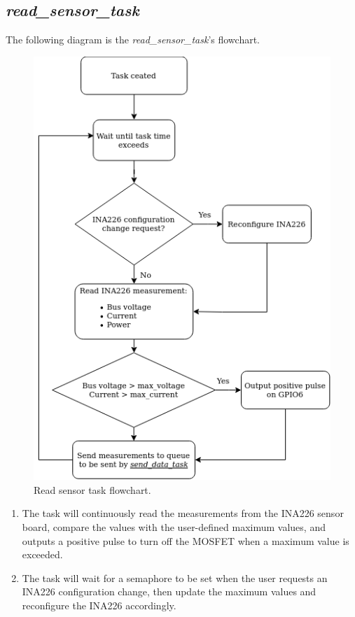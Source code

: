 \documentclass[../main.tex]{subfiles}
\begin{document}
    \pagebreak
    \subsection{\textit{read\_sensor\_task}}
    The following diagram is the \textit{read\_sensor\_task}'s flowchart.

    \begin{figure}[!h]
        \centerline{\includegraphics[scale=0.6]{media/read_sensor_task_flowchart.drawio.png}}
        \caption{Read sensor task flowchart.}
        \label{fig:read_sensor_task_flowchart}
    \end{figure}

    \begin{enumerate}
        \item The task will continuously read the measurements from the INA226 sensor board, compare the values with the user-defined maximum values, and outputs a positive pulse to turn off the MOSFET when a maximum value is exceeded.
        \item The task will wait for a semaphore to be set when the user requests an INA226 configuration change, then update the maximum values and reconfigure the INA226 accordingly.
    \end{enumerate}
\end{document}
